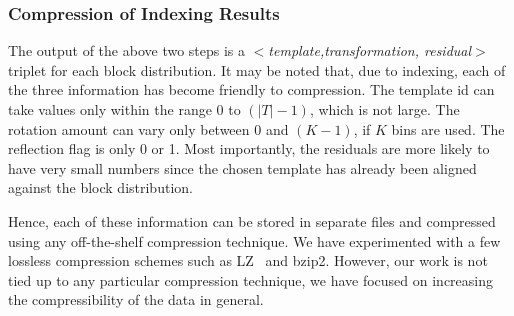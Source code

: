 \subsubsection{Compression of Indexing Results}
\label{subsubsec:compression}
The output of the above two steps is a $<$\emph{template,transformation, residual}$>$ triplet for each block distribution. It may be noted that, due to indexing, each of the three information has become friendly to compression. The template id can take values only within the range 0 to $(|T|-1)$, which is not large. The rotation amount can vary only between 0 and $(K-1)$, if $K$ bins are used. The reflection flag is only 0 or 1. Most importantly, the residuals are more likely to have very small numbers since the chosen template has already been aligned against the block distribution. 

Hence, each of these information can be stored in separate files and compressed using any off-the-shelf compression technique. We have experimented with a few lossless compression schemes such as LZ~\cite{lz77} and bzip2. However, our work is not tied up to any particular compression technique, we have focused on increasing the compressibility of the data in general.  
